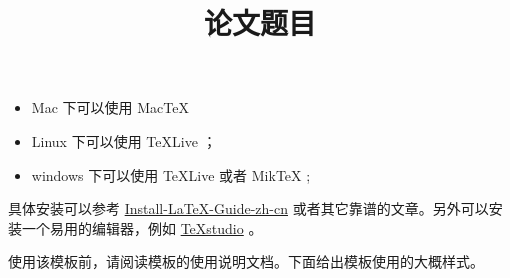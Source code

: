 \documentclass[withoutpreface,bwprint]{cumcmthesis} %
\begin{document}
\begin{itemize}
    \item Mac 下可以使用 Mac\TeX{}
    \item Linux 下可以使用 \TeX{}Live ；
    \item windows 下可以使用 \TeX{}Live 或者 Mik\TeX{} ;
\end{itemize}

具体安装可以参考 \href{https://github.com/OsbertWang/install-latex-guide-zh-cn/releases/}{Install-LaTeX-Guide-zh-cn} 或者其它靠谱的文章。另外可以安装一个易用的编辑器，例如 \href{https://mirrors.tuna.tsinghua.edu.cn/github-release/texstudio-org/texstudio/LatestRelease/}{\TeX{}studio} 。

使用该模板前，请阅读模板的使用说明文档。下面给出模板使用的大概样式。

 \fi

    \title{论文题目}
\end{document}
